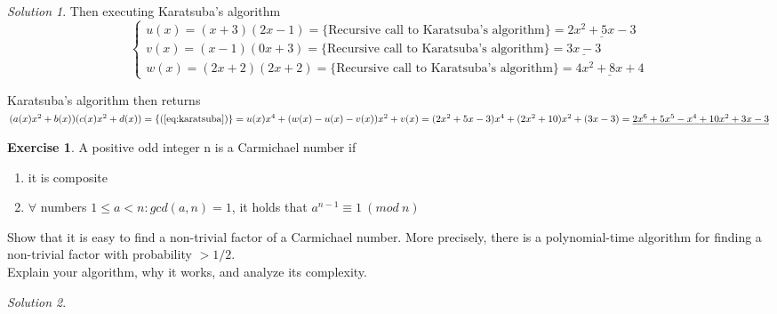 \documentclass[a4paper,twoside=false,abstract=false,numbers=noenddot,
titlepage=false,headings=small,parskip=half,version=last]{scrartcl}
\theoremstyle{definition}
\newtheorem{exercise}{Exercise}
\theoremstyle{remark}
\newtheorem*{solution}{Solution}
\begin{document}
\begin{solution}
Then executing Karatsuba's algorithm
\begin{equation*}
    \begin{cases}
        u(x) = (x+3)(2x-1)=\{\mbox{Recursive call to Karatsuba's algorithm}\} =
        \underline{2x^2+5x-3} \\
        v(x) = (x-1)(0x+3)= \{\mbox{Recursive call to Karatsuba's algorithm}\}
        =\underline{3x-3} \\ 
        w(x) = (2x+2)(2x+2)=\{\mbox{Recursive call to Karatsuba's algorithm}\} =
        \underline{4x^2+8x+4}
    \end{cases}
\end{equation*}

Karatsuba's algorithm then returns\\
    $(a(x)x^2+b(x))(c(x)x^2+d(x))= \{(\ref{eq:karatsuba})\}
    = u(x)x^4+(w(x)-u(x)-v(x))x^2+v(x) \\
    = (2x^2+5x-3)x^4+(2x^2+10)x^2+(3x-3) =\underline{2x^6+5x^5-x^4+10x^2+3x-3}$

\end{solution}
\begin{exercise}
A positive odd integer n is a Carmichael number if
\begin{enumerate}
\item
it is composite
\item
$\forall$ numbers $1 \le a < n : gcd(a,n)=1$, it holds that $a^{n-1}\equiv 1
    \ (mod\ n)$
\end{enumerate}
Show that it is easy to find a non-trivial factor of a Carmichael number. More
precisely, there is a polynomial-time algorithm for finding a non-trivial
factor with probability $> 1/2$.\\
Explain your algorithm, why it works, and analyze its complexity.
\end{exercise}
\begin{solution}

\end{solution}
\end{document}
